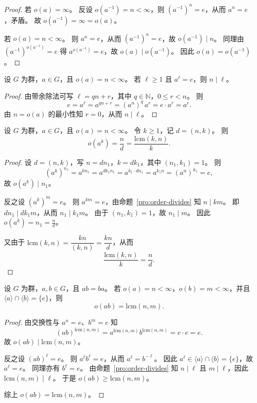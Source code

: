 \documentclass[lang=cn,a4paper,newtx]{elegantbook}
\begin{document}
\begin{proof}
  若 $o(a)=\infty$。
  反设 $o(a^{-1})=n<\infty$，则 $(a^{-1})^n=e$，从而 $a^n=e$，矛盾。
  故 $o(a^{-1})=\infty=o(a)$。

  若 $o(a)=n<\infty$。
  则 $a^n=e$，从而 $(a^{-1})^n=e$，故 $o(a^{-1})\mid n$。
  同理由 $(a^{-1})^{o(a^{-1})}=e$ 得 $a^{o(a^{-1})}=e$，故 $o(a)\mid o(a^{-1})$。
  因此 $o(a)=o(a^{-1})$。
\end{proof}

\begin{proposition}\label{order-divides}
  设 $G$ 为群，$a\in G$，且 $o(a)=n<\infty$。
  若 $\ell\ge 1$ 且 $a^{\ell}=e$，则 $n\mid \ell$。
\end{proposition}

\begin{proof}
  由带余除法可写 $\ell=qn+r$，其中 $q\in\mathbb{N}$，$0\le r<n$。
  则
  \[
    e=a^{\ell}=a^{qn+r}=(a^n)^q\,a^r=e\cdot a^r=a^r.
  \]
  由 $n=o(a)$ 的最小性知 $r=0$，从而 $n\mid \ell$。
\end{proof}

\begin{proposition}\label{order-of-power}
  设 $G$ 为群，$a\in G$，且 $o(a)=n<\infty$。
  令 $k\ge 1$，记 $d=(n,k)$。
  则
  \[
    o(a^k)=\frac{n}{d}=\frac{\mathrm{lcm}(k,n)}{k}.
  \]
\end{proposition}

\begin{proof}
  设 $d=(n,k)$，写 $n=dn_1$，$k=dk_1$，其中 $(n_1,k_1)=1$。
  则
  \[
    (a^k)^{n_1}=a^{kn_1}=a^{dk_1n_1}=a^{k_1\cdot dn_1}=a^{k_1n}=(a^n)^{k_1}=e,
  \]
  故 $o(a^k)\mid n_1$。

  反之设 $(a^k)^m=e$。
  则 $a^{km}=e$，由命题~\ref{pro:order-divides} 知 $n\mid km$。
  即 $dn_1\mid dk_1m$，从而 $n_1\mid k_1m$。
  由于 $(n_1,k_1)=1$，故 $n_1\mid m$。
  因此 $o(a^k)=n_1=\frac{n}{d}$。

  又由于 $\mathrm{lcm}(k,n)=\dfrac{kn}{(k,n)}=\dfrac{k n}{d}$，从而
  \[
    \frac{\mathrm{lcm}(k,n)}{k}=\frac{n}{d}.
  \]
\end{proof}

\begin{proposition}\label{order-of-product}
  设 $G$ 为群，$a,b\in G$，且 $ab=ba$。
  若 $o(a)=n<\infty$，$o(b)=m<\infty$，并且 $\langle a\rangle\cap \langle b\rangle=\{e\}$，则
  \[
    o(ab)=\mathrm{lcm}(n,m).
  \]
\end{proposition}

\begin{proof}
  由交换性与 $a^n=e$、$b^m=e$ 知
  \[
    (ab)^{\mathrm{lcm}(n,m)}=a^{\mathrm{lcm}(n,m)}b^{\mathrm{lcm}(n,m)}=e\cdot e=e.
  \]
  故 $o(ab)\mid \mathrm{lcm}(n,m)$。

  反之设 $(ab)^\ell=e$。
  则 $a^\ell b^\ell=e$，从而 $a^\ell=b^{-\ell}$。
  因此 $a^\ell\in \langle a\rangle\cap\langle b\rangle=\{e\}$，故 $a^\ell=e$。
  同理亦有 $b^\ell=e$。
  由命题~\ref{pro:order-divides} 知 $n\mid \ell$ 且 $m\mid \ell$，因此 $\mathrm{lcm}(n,m)\mid \ell$。
  于是 $o(ab)\ge \mathrm{lcm}(n,m)$。

  综上 $o(ab)=\mathrm{lcm}(n,m)$。
\end{proof}
\end{document}
